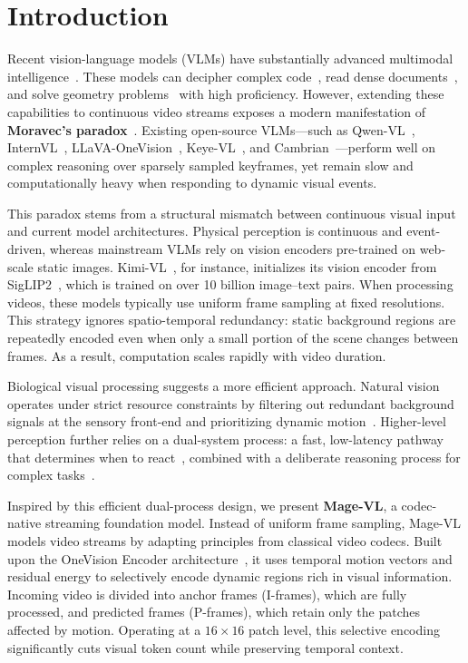 \section{Introduction}
\label{sec:introduction}



Recent vision-language models (VLMs) have substantially advanced multimodal intelligence~\cite{anthropic2026claude5,deepmind2025gemini3pro,openai2026gpt55}. These models can decipher complex code~\cite{anthropic2026claude5}, read dense documents~\cite{deepmind2025gemini3pro}, and solve geometry problems~\cite{openai2026gpt55} with high proficiency. However, extending these capabilities to continuous video streams exposes a modern manifestation of \textbf{Moravec's paradox}~\cite{moravec1988mind}. Existing open-source VLMs—such as Qwen-VL~\cite{qwen3vl,bai2025qwen25vl}, InternVL~\cite{internvl3}, LLaVA-OneVision~\cite{li2024llavaonevision15}, Keye-VL~\cite{Keye-VL-1.5}, and Cambrian~\cite{cambrian}—perform well on complex reasoning over sparsely sampled keyframes, yet remain slow and computationally heavy when responding to dynamic visual events.

This paradox stems from a structural mismatch between continuous visual input and current model architectures. Physical perception is continuous and event-driven, whereas mainstream VLMs rely on vision encoders pre-trained on web-scale static images. Kimi-VL~\cite{kimi2025vl}, for instance, initializes its vision encoder from SigLIP2~\cite{tschannen2025siglip}, which is trained on over 10 billion image--text pairs. When processing videos, these models typically use uniform frame sampling at fixed resolutions. This strategy ignores spatio-temporal redundancy: static background regions are repeatedly encoded even when only a small portion of the scene changes between frames. As a result, computation scales rapidly with video duration.

Biological visual processing suggests a more efficient approach. Natural vision operates under strict resource constraints by filtering out redundant background signals at the sensory front-end and prioritizing dynamic motion~\cite{sterling2015principles,niven2008energy,gollisch2010eye}. Higher-level perception further relies on a dual-system process: a fast, low-latency pathway that determines when to react~\cite{goodale1992separate}, combined with a deliberate reasoning process for complex tasks~\cite{kahneman2011thinking}.

Inspired by this efficient dual-process design, we present \textbf{Mage-VL}, a codec-native streaming foundation model. Instead of uniform frame sampling, Mage-VL models video streams by adapting principles from classical video codecs. Built upon the OneVision Encoder architecture~\cite{ovencoder2026}, it uses temporal motion vectors and residual energy to selectively encode dynamic regions rich in visual information. Incoming video is divided into anchor frames (I-frames), which are fully processed, and predicted frames (P-frames), which retain only the patches affected by motion. Operating at a $16 \times 16$ patch level, this selective encoding significantly cuts visual token count while preserving temporal context.

